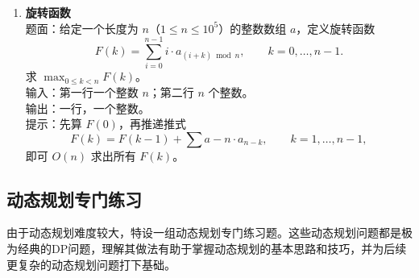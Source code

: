 \documentclass{article}
\begin{document}
\begin{enumerate}[label=\textbf{H\arabic*.}]
  \item \textbf{旋转函数}\\
    题面：给定一个长度为 $n$（$1\le n\le 10^5$）的整数数组 $a$，定义旋转函数
    $$F(k)=\sum_{i=0}^{n-1} i\cdot a_{(i+k)\bmod n},\qquad k=0,\dots ,n-1.$$
    求 $\max_{0\le k<n} F(k)$。\\
    输入：第一行一个整数 $n$；第二行 $n$ 个整数。\\
    输出：一行，一个整数。\\
    提示：先算 $F(0)$，再推递推式
    $$F(k)=F(k-1)+\sum a - n\cdot a_{n-k},\qquad k=1,\dots ,n-1,$$
    即可 $O(n)$ 求出所有 $F(k)$。
\end{enumerate}

\subsection{动态规划专门练习}

由于动态规划难度较大，特设一组动态规划专门练习题。这些动态规划问题都是极为经典的DP问题，理解其做法有助于掌握动态规划的基本思路和技巧，并为后续更复杂的动态规划问题打下基础。
\end{document}
